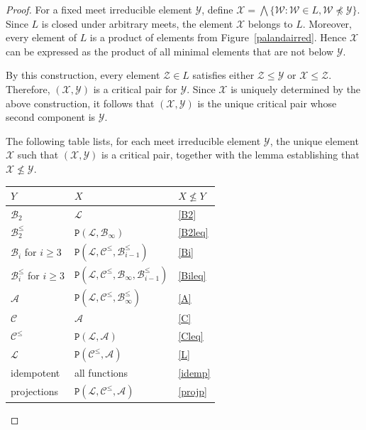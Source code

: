 \documentclass{amsart}
\numberwithin{equation}{section}
\theoremstyle{plain}
\theoremstyle{definition}
\def\clone#1{\mathcal{#1}}
\def\Bc{\clone{B}}
\def\Ac{\clone{A}}
\def\Lc{\clone{L}}
\def\Cc{\clone{C}}
\def\C#1{{\mathtt{P}}(#1)}
\begin{document}
\begin{proof}
For a fixed meet irreducible element $\clone{Y}$, define $\clone{X} = \bigwedge \{\clone{W}:\clone{W}\in L,\clone{W}\not\preceq \clone{Y}\}$. 
Since $L$ is closed under arbitrary meets, the element $\clone{X}$ belongs to $L$. Moreover, every element of $L$ is a product of elements from Figure~\ref{palandairred}. Hence $\clone{X}$ can be expressed as the product of all minimal elements that are not below $\clone{Y}$.

By this construction, every element $\clone{Z}\in L$ satisfies either $\clone{Z}\leq \clone{Y}$ or $\clone{X}\leq \clone{Z}$.
Therefore, $(\clone{X},\clone{Y})$ is a critical pair for $\clone{Y}$. Since $\clone{X}$ is uniquely determined by the above construction, it follows that $(\clone{X},\clone{Y})$ is the unique critical pair whose second component is $\clone{Y}$.

The following table lists, for each meet irreducible element $\clone{Y}$, the unique element $\clone{X}$ such that $(\clone{X},\clone{Y})$ is a critical pair, together with the lemma establishing that $\clone{X}\not\leq\clone{Y}$.

\begin{center}
\begin{tabular}{ |l|l|l| } 
 \hline
 $Y$                       & $X$                                       & $X\not\leq Y$ \\
 \hline
 $\Bc_2$                   & $\Lc$                                     & \ref{B2} \\
 $\Bc_2^\leq$               & $\C{\Lc,\Bc_\infty}$                       & \ref{B2leq} \\
 $\Bc_i$ for $i\geq 3$     & $\C{\Lc,\Cc^\leq,\Bc_{i-1}^\leq}$           & \ref{Bi} \\
 $\Bc_i^\leq$ for $i\geq 3$ & $\C{\Lc,\Cc^\leq,\Bc_\infty,\Bc_{i-1}^\leq}$ & \ref{Bileq} \\
 $\Ac$                     & $\C{\Lc,\Cc^\leq,\Bc_\infty^\leq}$          & \ref{A} \\
 $\Cc$                     & $\Ac$                                     & \ref{C} \\
 $\Cc^\leq$                 & $\C{\Lc,\Ac}$                             & \ref{Cleq} \\
 $\Lc$                     & $\C{\Cc^\leq,\Ac}$                         & \ref{L} \\
 idempotent                & all functions                             & \ref{idemp} \\
 projections               & $\C{\Lc,\Cc^\leq,\Ac}$                     & \ref{projp} \\
 \hline
\end{tabular}
\end{center}
\end{proof}
\end{document}
